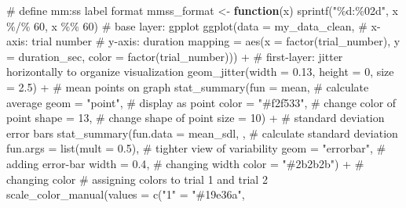 \documentclass[
  letterpaper,
  DIV=11,
  numbers=noendperiod]{scrartcl}
\newenvironment{Shaded}{\begin{snugshade}}{\end{snugshade}}
\newcommand{\AttributeTok}[1]{\textcolor[rgb]{0.40,0.45,0.13}{#1}}
\newcommand{\CommentTok}[1]{\textcolor[rgb]{0.37,0.37,0.37}{#1}}
\newcommand{\ControlFlowTok}[1]{\textcolor[rgb]{0.00,0.23,0.31}{\textbf{#1}}}
\newcommand{\DecValTok}[1]{\textcolor[rgb]{0.68,0.00,0.00}{#1}}
\newcommand{\FloatTok}[1]{\textcolor[rgb]{0.68,0.00,0.00}{#1}}
\newcommand{\FunctionTok}[1]{\textcolor[rgb]{0.28,0.35,0.67}{#1}}
\newcommand{\NormalTok}[1]{\textcolor[rgb]{0.00,0.23,0.31}{#1}}
\newcommand{\OtherTok}[1]{\textcolor[rgb]{0.00,0.23,0.31}{#1}}
\newcommand{\SpecialCharTok}[1]{\textcolor[rgb]{0.37,0.37,0.37}{#1}}
\newcommand{\StringTok}[1]{\textcolor[rgb]{0.13,0.47,0.30}{#1}}
\begin{document}
\begin{Shaded}
\begin{Highlighting}[]
\CommentTok{\# define mm:ss label format}
\NormalTok{mmss\_format }\OtherTok{\textless{}{-}} \ControlFlowTok{function}\NormalTok{(x) }\FunctionTok{sprintf}\NormalTok{(}\StringTok{"\%d:\%02d"}\NormalTok{, x }\SpecialCharTok{\%/\%} \DecValTok{60}\NormalTok{, x }\SpecialCharTok{\%\%} \DecValTok{60}\NormalTok{)}
\CommentTok{\# base layer: gpplot}
\FunctionTok{ggplot}\NormalTok{(}\AttributeTok{data =}\NormalTok{ my\_data\_clean, }
       \CommentTok{\# x{-}axis: trial number}
       \CommentTok{\# y{-}axis: duration}
       \AttributeTok{mapping =} \FunctionTok{aes}\NormalTok{(}\AttributeTok{x =} \FunctionTok{factor}\NormalTok{(trial\_number), }
                     \AttributeTok{y =}\NormalTok{ duration\_sec, }
                     \AttributeTok{color =} \FunctionTok{factor}\NormalTok{(trial\_number))) }\SpecialCharTok{+} 
  \CommentTok{\# first{-}layer: jitter horizontally to organize visualization}
  \FunctionTok{geom\_jitter}\NormalTok{(}\AttributeTok{width =} \FloatTok{0.13}\NormalTok{,}
              \AttributeTok{height =} \DecValTok{0}\NormalTok{,}
              \AttributeTok{size =} \FloatTok{2.5}\NormalTok{) }\SpecialCharTok{+}
  \CommentTok{\# mean points on graph}
  \FunctionTok{stat\_summary}\NormalTok{(}\AttributeTok{fun =}\NormalTok{ mean, }\CommentTok{\# calculate average}
               \AttributeTok{geom =} \StringTok{"point"}\NormalTok{,  }\CommentTok{\# display as point}
               \AttributeTok{color =} \StringTok{"\#f2f533"}\NormalTok{, }\CommentTok{\# change color of point}
               \AttributeTok{shape =} \DecValTok{13}\NormalTok{, }\CommentTok{\# change shape of point}
               \AttributeTok{size =} \DecValTok{10}\NormalTok{) }\SpecialCharTok{+}
  \CommentTok{\# standard deviation error bars}
  \FunctionTok{stat\_summary}\NormalTok{(}\AttributeTok{fun.data =}\NormalTok{ mean\_sdl, , }\CommentTok{\# calculate standard deviation}
               \AttributeTok{fun.args =} \FunctionTok{list}\NormalTok{(}\AttributeTok{mult =} \FloatTok{0.5}\NormalTok{), }\CommentTok{\# tighter view of variability}
               \AttributeTok{geom =} \StringTok{"errorbar"}\NormalTok{, }\CommentTok{\# adding error{-}bar}
               \AttributeTok{width =} \FloatTok{0.4}\NormalTok{, }\CommentTok{\# changing width}
               \AttributeTok{color =} \StringTok{"\#2b2b2b"}\NormalTok{) }\SpecialCharTok{+} \CommentTok{\# changing color}
  \CommentTok{\# assigning colors to trial 1 and trial 2 }
  \FunctionTok{scale\_color\_manual}\NormalTok{(}\AttributeTok{values =} \FunctionTok{c}\NormalTok{(}\StringTok{"1"} \OtherTok{=} \StringTok{"\#19e36a"}\NormalTok{,}

\end{Highlighting}
\end{Shaded}
\end{document}
